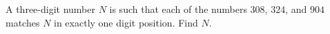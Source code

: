 A three-digit number $N$ is such that each of the numbers $308$, $324$, and $904$ matches $N$ in exactly one digit position. Find $N$.
